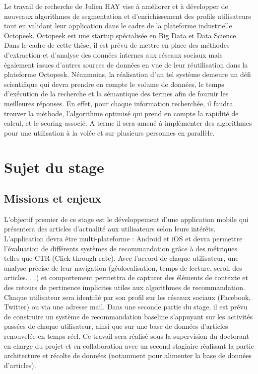 Le travail de recherche de Julien HAY vise à améliorer et à développer de nouveaux algorithmes de segmentation et d'enrichissement des profils utilisateurs tout en validant leur application dans le cadre de la plateforme industrielle Octopeek. Octopeek est une startup spécialisée en Big Data et Data Science. Dans le cadre de cette thèse, il est prévu de mettre en place des méthodes d'extraction et d'analyse des données internes aux réseaux sociaux mais également issues d'autres sources de données en vue de leur réutilisation dans la plateforme Octopeek. Néanmoins, la réalisation d'un tel système demeure un défi scientifique qui devra prendre en compte le volume de données, le temps d'exécution de la recherche et la sémantique des termes afin de fournir les meilleures réponses. En effet, pour chaque information recherchée, il faudra trouver la méthode, l'algorithme optimisé qui prend en compte la rapidité de calcul, et le scoring associé. A terme il sera amené à implémenter des algorithmes pour une utilisation à la volée et sur plusieurs personnes en parallèle.


\section{Sujet du stage}

\subsection{Missions et enjeux}

L'objectif premier de ce stage est le développement d’une application mobile qui présentera des articles d’actualité aux utilisateurs selon leurs intérêts. L’application devra être multi-plateforme : Android et iOS et devra permettre l’évaluation de différents systèmes de recommandation grâce à des métriques telles que CTR (Click-through rate). Avec l’accord de chaque utilisateur, une analyse précise de leur navigation (géolocalisation, temps de lecture, scroll des articles. . .) et comportement permettra de capturer des éléments de contexte et des retours de pertinence implicites utiles aux algorithmes de recommandation. Chaque utilisateur sera identifié par son profil sur les réseaux sociaux (Facebook, Twitter) ou via une adresse mail. Dans une seconde partie du stage, il est prévu de construire un système de recommandation baseline s’appuyant sur les activités passées de chaque utilisateur, ainsi que sur une base de données d’articles renouvelée en temps réel. Ce travail sera réalisé sous la supervision du doctorant en charge du projet et en collaboration avec un second stagiaire réalisant la partie architecture et récolte de données (notamment pour alimenter la base de données d’articles). 

